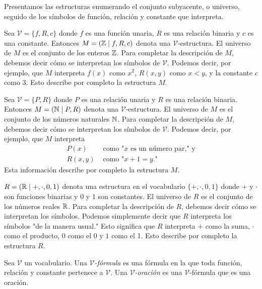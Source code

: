 \documentclass[12pt,a4paper]{book}
\newcommand{\comillas}[1]{"#1"}
\newcommand{\VV}{\mathcal{V}}
\begin{document}
    Presentamos las estructuras enumerando el conjunto subyacente, o universo, seguido de los símbolos de función, relación
    y constante que interpreta.

    \begin{ejemplo}\label{ej:estructura-Z}
        Sea $\VV=\{f,R,c\}$ donde $f$ es una función unaria, $R$ es una relación binaria y $c$ es una constante. Entonces
        $M=(\mathbb{Z}\mid f,R,c)$ denota una $\VV$-estructura. El universo de $M$ es el conjunto de los enteros $\mathbb{Z}$. Para
        completar la descripción de $M$, debemos decir cómo se interpretan los símbolos de $\VV$. Podemos decir, por
        ejemplo, que $M$ interpreta $f(x)$ como $x^{2}$, $R(x,y)$ como $x<y$, y la constante $c$ como 3. Esto describe por
        completo la estructura $M$.
    \end{ejemplo}

    \begin{ejemplo}\label{ej:estructura-N}
        Sea $\VV=\{P,R\}$ donde $P$ es una relación unaria y $R$ es una relación binaria. Entonces $M=(\mathbb{N}\mid P,R)$ denota
        una $\VV$-estructura. El universo de $M$ es el conjunto de los números naturales $\mathbb{N}$. Para completar la
        descripción de $M$, debemos decir cómo se interpretan los símbolos de $\VV$. Podemos decir, por ejemplo, que $M$
        interpreta
        \begin{align*}
            P(x)&\text{ como \comillas{$x$ es un número par,} y}\\
            R(x,y)&\text{ como \comillas{$x+1=y$.}}
        \end{align*}
        Esta información describe por completo la estructura $M$.
    \end{ejemplo}

    \begin{ejemplo}\label{ej:estructura-R-aritmetica}
        $R=(\mathbb{R}\mid+,\cdot,0,1)$ denota una estructura en el vocabulario $\{+,\cdot,0,1\}$ donde $+$ y $\cdot$ son funciones
        binarias y $0$ y $1$ son constantes. El universo de $R$ es el conjunto de los números reales $\mathbb{R}$. Para completar la
        descripción de $R$, debemos decir cómo se interpretan los símbolos. Podemos simplemente decir que $R$ interpreta los
        símbolos \comillas{de la manera usual.} Esto significa que $R$ interpreta $+$ como la suma, $\cdot$ como el
        producto, $0$ como el 0 y $1$ como el 1. Esto describe por completo la estructura $R$.
    \end{ejemplo}

    \begin{definicion}\label{def:v-formula-sentencia}
        Sea $\VV$ un vocabulario. Una \textit{$\VV$-fórmula} es una fórmula en la que toda función, relación y constante
        pertenece a $\VV$. Una \textit{$\VV$-oración} es una $\VV$-fórmula que es una oración.
    \end{definicion}
\end{document}
